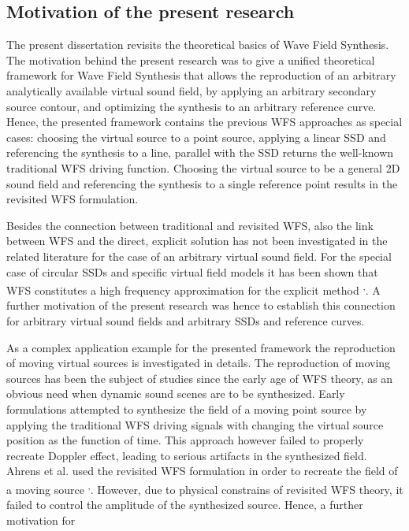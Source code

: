 \documentclass[10pt,twoside]{article}
\theoremstyle{thesisgroupstyle}
\begin{document}
\subsection{Motivation of the present research}
The present dissertation revisits the theoretical basics of Wave Field Synthesis.
The motivation behind the present research was to give a unified theoretical framework for Wave Field Synthesis that allows the reproduction of an arbitrary analytically available virtual sound field, by applying an arbitrary secondary source contour, and optimizing the synthesis to an arbitrary reference curve.
Hence, the presented framework contains the previous WFS approaches as special cases: choosing the virtual source to a point source, applying a linear SSD and referencing the synthesis to a line, parallel with the SSD returns the well-known traditional WFS driving function.
Choosing the virtual source to be a general 2D sound field and referencing the synthesis to a single reference point results in the revisited WFS formulation.

Besides the connection between traditional and revisited WFS, also the link between WFS and the direct, explicit solution has not been investigated in the related literature for the case of an arbitrary virtual sound field.
For the special case of circular SSDs and specific virtual field models it has been shown that WFS constitutes a high frequency approximation for the explicit method \textsuperscript{,}.
A further motivation of the present research was hence to establish this connection for arbitrary virtual sound fields and arbitrary SSDs and reference curves.

As a complex application example for the presented framework the reproduction of moving virtual sources is investigated in details.
The reproduction of moving sources has been the subject of studies since the early age of WFS theory, as an obvious need when dynamic sound scenes are to be synthesized.
Early formulations attempted to synthesize the field of a moving point source by applying the traditional WFS driving signals with changing the virtual source position as the function of time.
This approach however failed to properly recreate Doppler effect, leading to serious artifacts in the synthesized field.
Ahrens et al. used the revisited WFS formulation in order to recreate the field of a moving source \textsuperscript{,}.
However, due to physical constrains of revisited WFS theory, it failed to control the amplitude of the synthesized source.
Hence, a further motivation for	


\printbibliography[title={Journal papers}, category=journal, prefixnumbers={J}, heading=subbibliography,resetnumbers=true]
\printbibliography[title={Conference papers}, category=conference, prefixnumbers={C}, heading=subbibliography, resetnumbers=true]
\printbibliography[title={Other publications}, category=other, prefixnumbers={O}, heading=subbibliography, resetnumbers=true]
\end{document}
